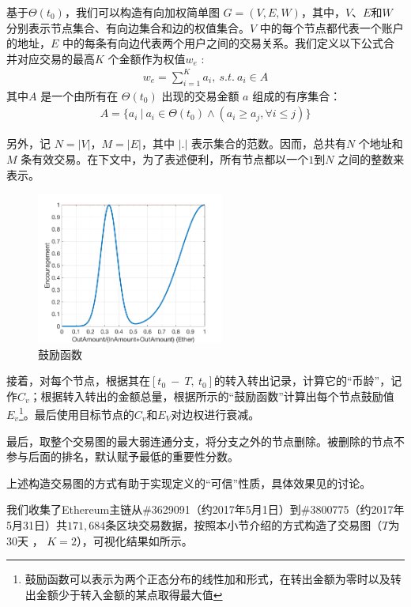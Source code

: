 基于$\Theta(t_0)$，我们可以构造有向加权简单图 $G = (V, E, W)$，其中，$V$、$E$和$W$ 分别表示节点集合、有向边集合和边的权值集合。$V$ 中的每个节点都代表一个账户的地址，$E$ 中的每条有向边代表两个用户之间的交易关系。我们定义以下公式合并对应交易的最高$K$ 个金额作为权值$w_e$ :
\begin{align}\label{formula:edgeweight}
w_e = \sum_{i=1}^K a_i,\ s.t.\ a_i \in A
\end{align}
其中$A$ 是一个由所有在 $\Theta(t_0)$ 出现的交易金额 $a$ 组成的有序集合：
\begin{align}
A = \{a_i\ |\ a_i \in \Theta(t_0) \land (a_i \ge a_j, \forall i \leq j) \}
\end{align}

另外，记 $N = |V|$，$M = |E|$，其中 $|.|$ 表示集合的范数。因而，总共有$N$ 个地址和$M$ 条有效交易。在下文中，为了表述便利，所有节点都以一个$1$到$N$ 之间的整数来表示。

\begin{figure}[h]
\centering
	\includegraphics[width=0.55\textwidth]{figs/encouragement_en.png}
	\caption{鼓励函数}\label{fig:encouragement}
\end{figure}

接着，对每个节点，根据其在$[t_0\ −\ T,\ t_0]$的转入转出记录，计算它的“币龄”，记作$C_v$；根据转入转出的金额总量，根据所示的“鼓励函数”计算出每个节点鼓励值$E_v$\footnote{鼓励函数可以表示为两个正态分布的线性加和形式，在转出金额为零时以及转出金额少于转入金额的某点取得最大值}。最后使用目标节点的$C_v$和$E_V$对边权进行衰减。

最后，取整个交易图的最大弱连通分支，将分支之外的节点删除。被删除的节点不参与后面的排名，默认赋予最低的重要性分数。

上述构造交易图的方式有助于实现定义的“可信”性质，具体效果见的讨论。

我们收集了Ethereum主链从\#3629091（约2017年5月1日）到\#3800775（约2017年5月31日）共$171,684$条区块交易数据，按照本小节介绍的方式构造了交易图（$T$为30天 ， $K=2$），可视化结果如所示。

